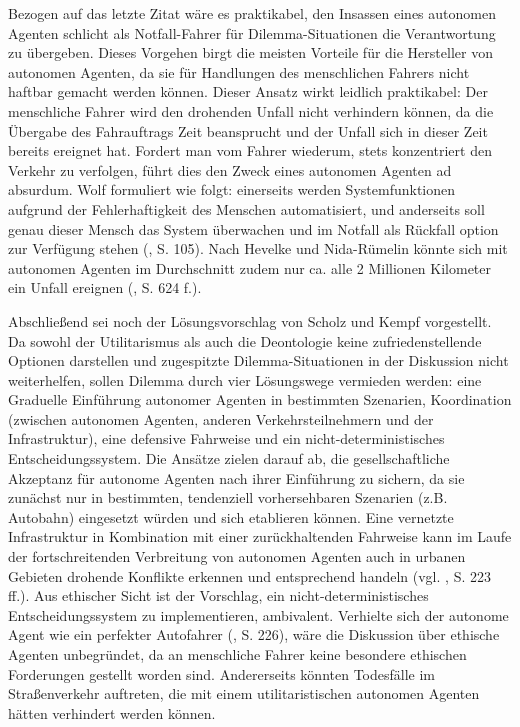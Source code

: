 \documentclass[a4paper, 12pt, titlepage]{scrartcl}
\begin{document}
	Bezogen auf das letzte Zitat w\"are es praktikabel, den Insassen eines autonomen Agenten schlicht als \glqq Notfall-Fahrer\grqq{} f\"ur Dilemma-Situationen die Verantwortung zu \"ubergeben. Dieses Vorgehen birgt die meisten Vorteile f\"ur die Hersteller von autonomen Agenten, da sie f\"ur Handlungen des menschlichen Fahrers nicht haftbar gemacht werden k\"onnen. Dieser Ansatz wirkt leidlich praktikabel: Der menschliche Fahrer wird den drohenden Unfall nicht verhindern k\"onnen, da die \"Ubergabe des Fahrauftrags Zeit beansprucht und der Unfall sich in dieser Zeit bereits ereignet hat. Fordert man vom Fahrer wiederum, stets konzentriert den Verkehr zu verfolgen, f\"uhrt dies den Zweck eines autonomen Agenten ad absurdum. Wolf \autocite{Wolf2015} formuliert wie folgt: \glqq einerseits werden Systemfunktionen aufgrund der Fehlerhaftigkeit des Menschen automatisiert, und anderseits soll genau dieser Mensch das System überwachen und im Notfall als Rückfall option zur Verfügung stehen\grqq{} (\autocite{Wolf2015}, S. 105).  Nach Hevelke und Nida-R{\"u}melin \autocite{Hevelke2015} k\"onnte sich mit autonomen Agenten im Durchschnitt zudem nur ca. alle 2 Millionen Kilometer ein Unfall ereignen (\autocite{Hevelke2015}, S. 624 f.). 
	
	Abschlie\ss end sei noch der L\"osungsvorschlag von Scholz und Kempf \autocite{Scholz2016} vorgestellt. Da sowohl der Utilitarismus als auch die Deontologie keine zufriedenstellende Optionen darstellen und zugespitzte Dilemma-Situationen in der Diskussion nicht weiterhelfen, sollen Dilemma durch vier L\"osungswege vermieden werden: eine Graduelle Einf\"uhrung autonomer Agenten in bestimmten Szenarien, Koordination (zwischen autonomen Agenten, anderen Verkehrsteilnehmern und der Infrastruktur), eine defensive Fahrweise und ein nicht-deterministisches Entscheidungssystem. Die Ans\"atze zielen darauf ab, die gesellschaftliche Akzeptanz f\"ur autonome Agenten nach ihrer Einf\"uhrung zu sichern, da sie zun\"achst nur in bestimmten, tendenziell vorhersehbaren Szenarien (z.B. Autobahn) eingesetzt w\"urden und sich etablieren k\"onnen. Eine vernetzte Infrastruktur in Kombination mit einer zur\"uckhaltenden Fahrweise kann im Laufe der fortschreitenden Verbreitung von autonomen Agenten auch in urbanen Gebieten drohende Konflikte erkennen und entsprechend handeln (vgl. \autocite{Scholz2016}, S. 223 ff.). 
	Aus ethischer Sicht ist der Vorschlag, ein nicht-deterministisches Entscheidungssystem zu implementieren, ambivalent. Verhielte sich der autonome Agent \glqq wie ein perfekter Autofahrer\grqq{} (\autocite{Scholz2016}, S. 226), w\"are die Diskussion \"uber ethische Agenten unbegr\"undet, da an menschliche Fahrer keine besondere ethischen Forderungen gestellt worden sind. Andererseits k\"onnten Todesf\"alle im Stra\ss enverkehr auftreten, die mit einem utilitaristischen autonomen Agenten h\"atten verhindert werden k\"onnen. 
\end{document}
